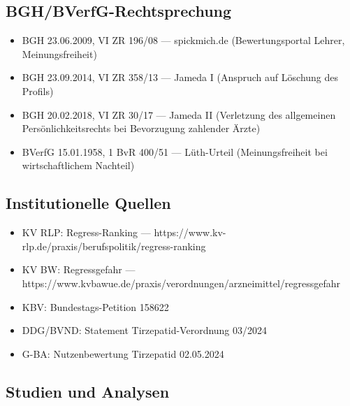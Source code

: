 \documentclass{umbruch-position}
\begin{document}
\subsection{BGH/BVerfG-Rechtsprechung}

\begin{itemize}[nosep]
  \item BGH 23.06.2009, VI ZR 196/08 --- spickmich.de (Bewertungsportal Lehrer, Meinungsfreiheit)
  \item BGH 23.09.2014, VI ZR 358/13 --- Jameda I (Anspruch auf Löschung des Profils)
  \item BGH 20.02.2018, VI ZR 30/17 --- Jameda II (Verletzung des allgemeinen Pers\"onlichkeitsrechts bei Bevorzugung zahlender \"Arzte)
  \item BVerfG 15.01.1958, 1 BvR 400/51 --- L\"uth-Urteil (Meinungsfreiheit bei wirtschaftlichem Nachteil)
\end{itemize}

\subsection{Institutionelle Quellen}

\begin{itemize}[nosep]
  \item KV RLP: Regress-Ranking — https://www.kv-rlp.de/praxis/berufspolitik/regress-ranking
  \item KV BW: Regressgefahr — https://www.kvbawue.de/praxis/verordnungen/arzneimittel/regressgefahr
  \item KBV: Bundestags-Petition 158622
  \item DDG/BVND: Statement Tirzepatid-Verordnung 03/2024
  \item G-BA: Nutzenbewertung Tirzepatid 02.05.2024
\end{itemize}

\subsection{Studien und Analysen}
\end{document}
